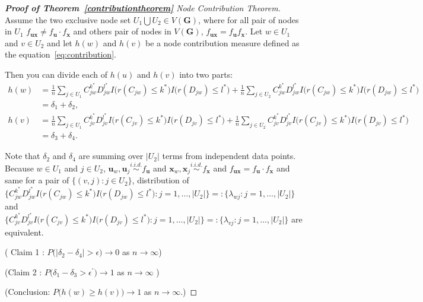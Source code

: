 \documentclass[11pt]{article}
\theoremstyle{definition}
\begin{document}
\begin{proof}[\textbf{Proof of Theorem~\ref{contributiontheorem}} Node Contribution Theorem]	
	
	Assume the two exclusive node set $U_{1} \bigcup U_{2} \in V(\mathbf{G})$, where for all pair of nodes in $U_{1}$ $f_{\mathbf{ux}} \neq f_{\mathbf{u}} \cdot f_{\mathbf{x}}$ and others pair of nodes in $V(\mathbf{G})$, $f_{\mathbf{ux}} = f_{\mathbf{u}} f_{\mathbf{x}}$. Let $w \in U_{1}$ and $v \in U_{2}$ and let $h(w)$ and $h(v)$ be a node contribution measure defined as the equation~\ref{eq:contribution}.  
	
	Then you can divide each of $h(u)$ and $h(v)$ into two parts:
	\begin{align*}
	\label{eq:contri1}
	h(w) & = \frac{1}{n} \sum\limits_{j \in U_{1}} C^{k^{*}}_{jw} D^{l^{*}}_{jw} I\big( r(C_{jw}) \leq k^{*} \big) I\big( r(D_{jw}) \leq l^{*} \big) + \frac{1}{n} \sum\limits_{j \in U_{2}} C^{k^{*}}_{jw} D^{l^{*}}_{jw} I\big( r(C_{jw}) \leq k^{*} \big) I\big( r(D_{jw}) \leq l^{*} \big) \\ & = \delta_{1} + \delta_{2}, \\ 
	h(v) & = \frac{1}{n} \sum\limits_{j \in U_{1}} C^{k^{*}}_{jv} D^{l^{*}}_{jv} I\big( r(C_{jv}) \leq k^{*} \big) I\big( r(D_{jv}) \leq l^{*} \big) + \frac{1}{n} \sum\limits_{j \in U_{2}} C^{k^{*}}_{jv} D^{l^{*}}_{jv} I\big( r(C_{jv}) \leq k^{*} \big) I\big( r(D_{jv}) \leq l^{*} \big) \\ & = \delta_{3} + \delta_{4}.  
	\end{align*}

Note that $\delta_{2}$ and $\delta_{4}$ are summing over $|U_{2}|$ terms from independent data points. Because $w \in U_{1}$ and $j \in U_{2}$,  $\mathbf{u}_{w}, \mathbf{u}_{j} \overset{i.i.d.}{\sim} f_{\mathbf{u}}$ and $\mathbf{x}_{w}, \mathbf{x}_{j} \overset{i.i.d.}{\sim} f_{\mathbf{x}}$ and $f_{\mathbf{u} \mathbf{x}} = f_{\mathbf{u}} \cdot f_{\mathbf{x}}$ and same for a pair of $\{  (v, j) : j \in U_{2} \}$, distribution of $\{ C^{k^{*}}_{jw} D^{l^{*}}_{jw} I\big( r(C_{jw}) \leq k^{*} \big) I\big( r(D_{jw}) \leq l^{*} \big) : j = 1,  \ldots, |U_{2}| \} = : \{ \lambda_{wj} : j = 1, \ldots, |U_{2}| \}$ and $\{   C^{k^{*}}_{jv} D^{l^{*}}_{jv} I\big( r(C_{jv}) \leq k^{*} \big) I\big( r(D_{jv}) \leq l^{*} \big) :  j = 1, \ldots, |U_{2}| \} =: \{ \lambda_{vj} : j = 1, \ldots, |U_{2}|  \}$ are equivalent. 	

( Claim 1 : $P\big(  |  \delta_{2} - \delta_{4}  | >  \epsilon  \big) \longrightarrow 0$ as $n \rightarrow \infty$) 


(Claim 2 : $P\big(  \delta_{1} - \delta_{3}    > \epsilon^{\prime}   \big) \longrightarrow 1$ as $n \rightarrow \infty$  )


(Conclusion: $P\big(  h(w) \geq h(v)   \big) \longrightarrow 1$ as $n \rightarrow \infty$.)


\end{proof}
\end{document}
